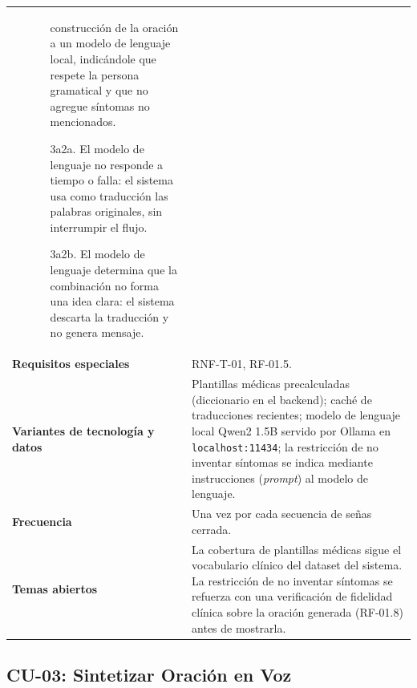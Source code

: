 \begin{longtable}{@{}>{\raggedright\arraybackslash}p{4.1cm} >{\raggedright\arraybackslash}p{\dimexpr\textwidth-4.1cm-2\tabcolsep\relax}@{}}
\begin{itemize}[leftmargin=*, itemsep=2pt]
\begin{itemize}[leftmargin=*, itemsep=2pt]
        construcción de la oración a un modelo de lenguaje local,
        indicándole que respete la persona gramatical y que no agregue
        síntomas no mencionados.
        \item[3a2a.] El modelo de lenguaje no responde a tiempo o falla:
        el sistema usa como traducción las palabras originales, sin
        interrumpir el flujo.
        \item[3a2b.] El modelo de lenguaje determina que la combinación no
        forma una idea clara: el sistema descarta la traducción y no
        genera mensaje.
    \end{itemize}
\end{itemize} \\
\textbf{Requisitos especiales} & RNF-T-01, RF-01.5. \\
\textbf{Variantes de tecnología y datos} &
Plantillas médicas precalculadas (diccionario en el backend); caché de
traducciones recientes; modelo de lenguaje local Qwen2 1.5B servido por
Ollama en \texttt{localhost:11434}; la restricción de no inventar
síntomas se indica mediante instrucciones (\textit{prompt}) al modelo de
lenguaje. \\
\textbf{Frecuencia} & Una vez por cada secuencia de señas cerrada. \\
\textbf{Temas abiertos} &
La cobertura de plantillas médicas sigue el vocabulario clínico del
dataset del sistema. La restricción de no inventar síntomas se refuerza
con una verificación de fidelidad clínica sobre la oración generada
(RF-01.8) antes de mostrarla. \\
\bottomrule
\end{longtable}

\subsection{CU-03: Sintetizar Oración en Voz}

